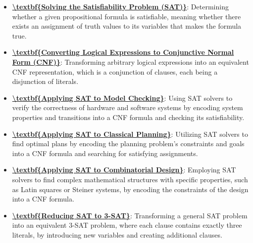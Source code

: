 \documentclass{article}%
\begin{document}
\begin{itemize}[leftmargin=*]%
\item \href{https://www.math.purdue.edu/~yipn/351/13L1-Logic.pdf#page=15}{\textbf{\textbackslash{}textbf\{Solving the Satisfiability Problem (SAT)\}}}: Determining whether a given propositional formula is satisfiable, meaning whether there exists an assignment of truth values to its variables that makes the formula true.%
\item \href{https://www.math.purdue.edu/~yipn/351/13L1-Logic.pdf#page=16}{\textbf{\textbackslash{}textbf\{Converting Logical Expressions to Conjunctive Normal Form (CNF)\}}}: Transforming arbitrary logical expressions into an equivalent CNF representation, which is a conjunction of clauses, each being a disjunction of literals.%
\item \href{https://www.math.purdue.edu/~yipn/351/13L1-Logic.pdf#page=20}{\textbf{\textbackslash{}textbf\{Applying SAT to Model Checking\}}}: Using SAT solvers to verify the correctness of hardware and software systems by encoding system properties and transitions into a CNF formula and checking its satisfiability.%
\item \href{https://www.math.purdue.edu/~yipn/351/13L1-Logic.pdf#page=21}{\textbf{\textbackslash{}textbf\{Applying SAT to Classical Planning\}}}: Utilizing SAT solvers to find optimal plans by encoding the planning problem's constraints and goals into a CNF formula and searching for satisfying assignments.%
\item \href{https://www.math.purdue.edu/~yipn/351/13L1-Logic.pdf#page=22}{\textbf{\textbackslash{}textbf\{Applying SAT to Combinatorial Design\}}}: Employing SAT solvers to find complex mathematical structures with specific properties, such as Latin squares or Steiner systems, by encoding the constraints of the design into a CNF formula.%
\item \href{https://www.math.purdue.edu/~yipn/351/13L1-Logic.pdf#page=24}{\textbf{\textbackslash{}textbf\{Reducing SAT to 3{-}SAT\}}}: Transforming a general SAT problem into an equivalent 3-SAT problem, where each clause contains exactly three literals, by introducing new variables and creating additional clauses.%
\end{itemize}%
\end{document}

